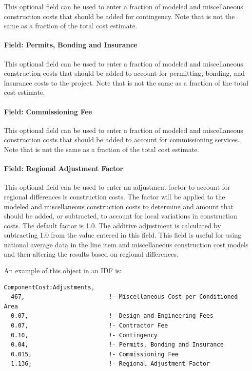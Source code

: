This optional field can be used to enter a fraction of modeled and miscellaneous construction costs that should be added for contingency. Note that is not the same as a fraction of the total cost estimate.

\paragraph{Field: Permits, Bonding and Insurance}\label{field-permits-bonding-and-insurance}

This optional field can be used to enter a fraction of modeled and miscellaneous construction costs that should be added to account for permitting, bonding, and insurance costs to the project. Note that is not the same as a fraction of the total cost estimate.

\paragraph{Field: Commissioning Fee}\label{field-commissioning-fee}

This optional field can be used to enter a fraction of modeled and miscellaneous construction costs that should be added to account for commissioning services. Note that is not the same as a fraction of the total cost estimate.

\paragraph{Field: Regional Adjustment Factor}\label{field-regional-adjustment-factor}

This optional field can be used to enter an adjustment factor to account for regional differences is construction costs. The factor will be applied to the modeled and miscellaneous construction costs to determine and amount that should be added, or subtracted, to account for local variations in construction costs. The default factor is 1.0. The additive adjustment is calculated by subtracting 1.0 from the value entered in this field. This field is useful for using national average data in the line item and miscellaneous construction cost models and then altering the results based on regional differences.

An example of this object in an IDF is:

\begin{lstlisting}
ComponentCost:Adjustments,
  467,                        !- Miscellaneous Cost per Conditioned Area
  0.07,                       !- Design and Engineering Fees
  0.07,                       !- Contractor Fee
  0.10,                       !- Contingency
  0.04,                       !- Permits, Bonding and Insurance
  0.015,                      !- Commissioning Fee
  1.136;                      !- Regional Adjustment Factor
\end{lstlisting}

